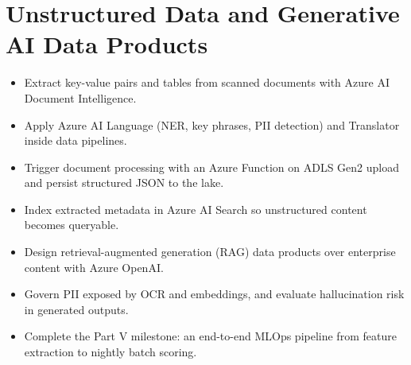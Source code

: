 \chapter{Unstructured Data and Generative AI Data Products}
%
\begin{objectives}
\begin{itemize}
    \item Extract key-value pairs and tables from scanned documents with Azure AI Document Intelligence.
    \item Apply Azure AI Language (NER, key phrases, PII detection) and Translator inside data pipelines.
    \item Trigger document processing with an Azure Function on ADLS Gen2 upload and persist structured JSON to the lake.
    \item Index extracted metadata in Azure AI Search so unstructured content becomes queryable.
    \item Design retrieval-augmented generation (RAG) data products over enterprise content with Azure OpenAI.
    \item Govern PII exposed by OCR and embeddings, and evaluate hallucination risk in generated outputs.
    \item Complete the Part V milestone: an end-to-end MLOps pipeline from feature extraction to nightly batch scoring.
\end{itemize}
\end{objectives}

